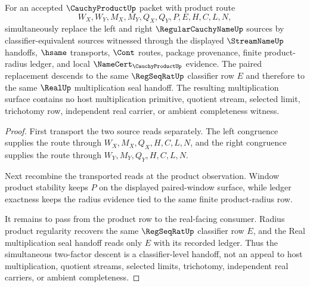 \begin{theorem}
\label{thm:cauchy-product-two-factor-classifier-descent}
For an accepted $\CauchyProductUp$ packet with product route
$$
W_X,W_Y,M_X,M_Y,Q_X,Q_Y,P,E,H,C,L,N,
$$
simultaneously replace the left and right $\RegularCauchyNameUp$ sources by classifier-equivalent sources witnessed through the displayed $\StreamNameUp$ handoffs, $\hsame$ transports, $\Cont$ routes, package provenance, finite product-radius ledger, and local $\NameCert_{\CauchyProductUp}$ evidence. The paired replacement descends to the same $\RegSeqRatUp$ classifier row $E$ and therefore to the same $\RealUp$ multiplication seal handoff. The resulting multiplication surface contains no host multiplication primitive, quotient stream, selected limit, trichotomy row, independent real carrier, or ambient completeness witness.
\end{theorem}
\begin{proof}
First transport the two source reads separately. The left congruence supplies the route through $W_X,M_X,Q_X,H,C,L,N$, and the right congruence supplies the route through $W_Y,M_Y,Q_Y,H,C,L,N$.

Next recombine the transported reads at the product observation. Window product stability keeps $P$ on the displayed paired-window surface, while ledger exactness keeps the radius evidence tied to the same finite product-radius row.

It remains to pass from the product row to the real-facing consumer. Radius product regularity recovers the same $\RegSeqRatUp$ classifier row $E$, and the Real multiplication seal handoff reads only $E$ with its recorded ledger. Thus the simultaneous two-factor descent is a classifier-level handoff, not an appeal to host multiplication, quotient streams, selected limits, trichotomy, independent real carriers, or ambient completeness.
\end{proof}

